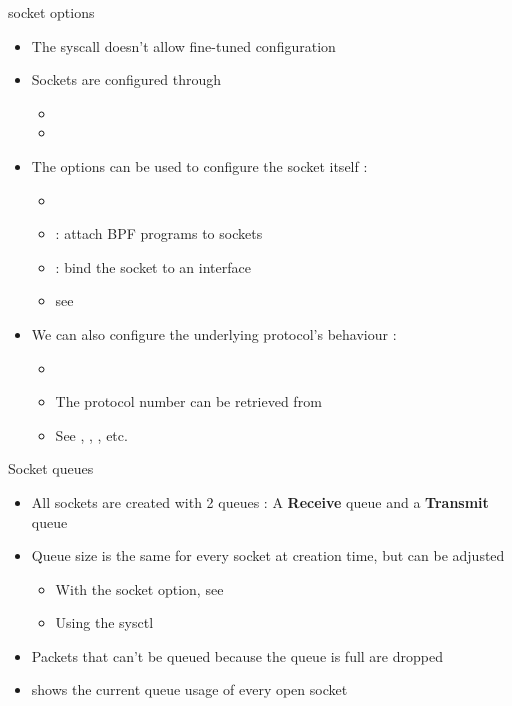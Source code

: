 \begin{frame}{socket options}
	\begin{itemize}
		\item The  syscall doesn't allow fine-tuned configuration
		\item Sockets are configured through 
			\begin{itemize}
				\item {}
				\item {}
			\end{itemize}
		\item The options can be used to configure the socket itself :
			\begin{itemize}
				\item {}
				\item {} : attach BPF programs to sockets
				\item {} : bind the socket to an interface
				\item see 
			\end{itemize}
		\item We can also configure the underlying protocol's behaviour :
			\begin{itemize}
				\item {}
				\item The protocol number can be retrieved from 
				\item See , , , etc.
			\end{itemize}
	\end{itemize}
\end{frame}

\begin{frame}{Socket queues}
	\begin{itemize}
		\item All sockets are created with 2 queues : A \textbf{Receive} queue and a \textbf{Transmit} queue
		\item Queue size is the same for every socket at creation time, but can be adjusted
			\begin{itemize}
				\item With the  socket option, see 
				\item Using the  sysctl
			\end{itemize}
		\item Packets that can't be queued because the queue is full are dropped
		\item {} shows the current queue usage of every open socket
	\end{itemize}
\end{frame}

